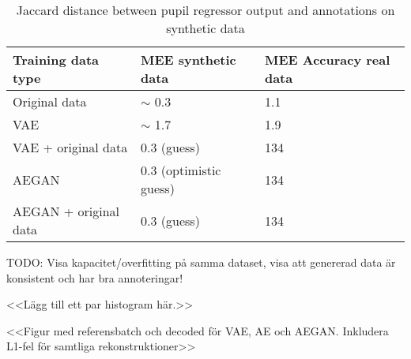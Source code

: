 \begin{table}[t]
    \centering
    \caption{Jaccard distance between pupil regressor output and annotations on synthetic data}
    \label{tab:quantitative_results}
    \begin{tabular}{l|l|l}
    \hline
    Training data type      & MEE synthetic data  & MEE Accuracy real data \\ \hline
    Original data           & $\sim$ 0.3 & 1.1     \\
    VAE                     & $\sim$ 1.7 & 1.9     \\
    VAE + original data     & 0.3 (guess) & 134     \\
    AEGAN                   & 0.3 (optimistic guess) & 134     \\
    AEGAN + original data   & 0.3 (guess) & 134     \\
    \end{tabular}
\end{table}




TODO: Visa kapacitet/overfitting på samma dataset, visa att genererad data är konsistent och har bra annoteringar!

<<Lägg till ett par histogram här.>>

<<Figur med referensbatch och decoded för VAE, AE och AEGAN. Inkludera L1-fel för samtliga rekonstruktioner>>


